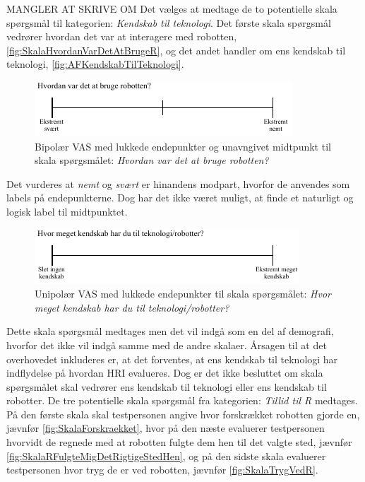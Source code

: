 \noindent
%
MANGLER AT SKRIVE OM\blankline
%
Det vælges at medtage de to potentielle skala spørgsmål til kategorien: \textit{Kendskab til teknologi}. Det første skala spørgsmål vedrører hvordan det var at interagere med robotten, \autoref{fig:SkalaHvordanVarDetAtBrugeR}, og det andet handler om ens kendskab til teknologi, \autoref{fig:AFKendskabTilTeknologi}.
%
\begin{figure}[H]
\centering
\includegraphics[width =\textwidth]{Figure/UdvalgteSkalaer/HvordanVarDetAtBrugeR} 
\caption{Bipolær VAS med lukkede endepunkter og unavngivet midtpunkt til skala spørgsmålet: \textit{Hvordan var det at bruge robotten?}}
\label{fig:SkalaHvordanVarDetAtBrugeR}
\end{figure}
\noindent
%
Det vurderes at \textit{nemt} og \textit{svært} er hinandens modpart, hvorfor de anvendes som labels på endepunkterne. Dog har det ikke været muligt, at finde et naturligt og logisk label til midtpunktet. 
%
\begin{figure}[H]
\centering
\includegraphics[width =\textwidth]{Figure/UdvalgteSkalaer/KendskabTilTeknologi} 
\caption{Unipolær VAS med lukkede endepunkter til skala spørgsmålet: \textit{Hvor meget kendskab har du til teknologi/robotter?}}
\label{fig:SkalaKendskabTilTeknologi}
\end{figure}
\noindent
%
Dette skala spørgsmål medtages men det vil indgå som en del af demografi, hvorfor det ikke vil indgå samme med de andre skalaer. Årsagen til at det overhovedet inkluderes er, at det forventes, at ens kendskab til teknologi har indflydelse på hvordan HRI evalueres. Dog er det ikke besluttet om skala spørgsmålet skal vedrører ens kendskab til teknologi eller ens kendskab til robotter. \blankline 
%
De tre potentielle skala spørgsmål fra kategorien: \textit{Tillid til R} medtages. På den første skala skal testpersonen angive hvor forskrækket robotten gjorde en, jævnfør \autoref{fig:SkalaForskraekket}, hvor på den næste evaluerer testpersonen hvorvidt de regnede med at robotten fulgte dem hen til det valgte sted, jævnfør \autoref{fig:SkalaRFulgteMigDetRigtigeStedHen}, og på den sidste skala evaluerer testpersonen hvor tryg de er ved robotten, jævnfør \autoref{fig:SkalaTrygVedR}.
